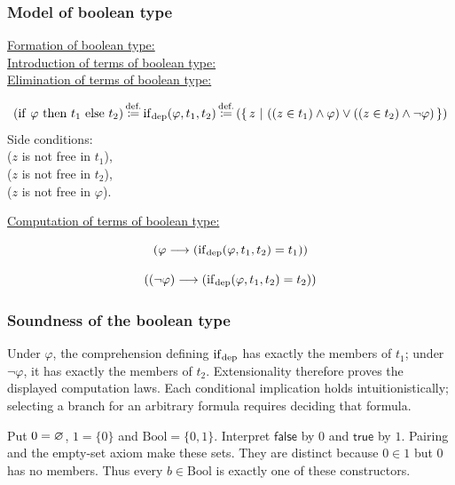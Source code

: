 \subsubsection{Model of boolean type}
\underline{Formation of boolean type:}\\
\underline{Introduction of terms of boolean type:}\\
\underline{Elimination of terms of boolean type:}\\
\begin{definition}
\[
(\lif\ \varphi\ \lthen\ t_1\ \lelse\ t_2) \eqdef \lifdep(\varphi, t_1, t_2) \eqdef (\cc{z}{((z\in t_1)\land\varphi)\lor((z\in t_2)\land\neg\varphi)})
\]
Side conditions:\\
($z$ is not free in $t_1$),\\
($z$ is not free in $t_2$),\\
($z$ is not free in $\varphi$).
\end{definition}
\underline{Computation of terms of boolean type:}\\
\begin{theorem}
\[
(\varphi \longrightarrow (\mathrm{if}_{\mathrm{dep}}(\varphi, t_1, t_2) = t_1))
\]
\end{theorem}
\begin{theorem}
\[
((\neg\varphi) \longrightarrow (\mathrm{if}_{\mathrm{dep}}(\varphi, t_1, t_2) = t_2))
\]
\end{theorem}

\subsubsection{Soundness of the boolean type}
Under $\varphi$, the comprehension defining $\mathrm{if}_{\mathrm{dep}}$ has exactly the
members of $t_1$; under $\neg\varphi$, it has exactly the members of $t_2$.
Extensionality therefore proves the displayed computation laws. Each
conditional implication holds intuitionistically; selecting a branch for
an arbitrary formula requires deciding that formula.



\begin{definition}
Put $0=\varnothing$, $1=\{0\}$ and
$\mathrm{Bool}=\{0,1\}$. Interpret $\mathsf{false}$ by $0$ and
$\mathsf{true}$ by $1$. Pairing and the empty-set axiom make these sets.
They are distinct because $0\in1$ but $0$ has no members. Thus every
$b\in\mathrm{Bool}$ is exactly one of these constructors.
\end{definition}

